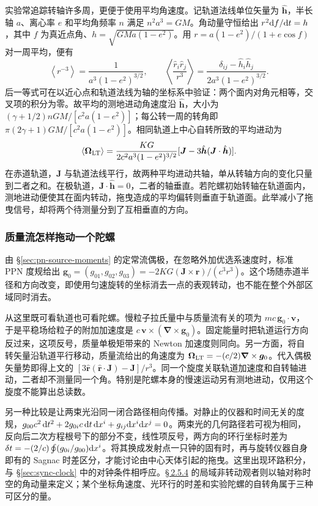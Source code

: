 实验常追踪转轴许多周，更便于使用平均角速度。记轨道法线单位矢量为 $\hat{\bm h}$，半长轴 $a$、离心率 $e$ 和平均角频率 $n$ 满足 $n^2a^3=GM$。角动量守恒给出 $r^2\dd f/\dd t=h$，其中 $f$ 为真近点角、$h=\sqrt{GMa(1-e^2)}$。用 $r=a(1-e^2)/(1+e\cos f)$ 对一周平均，便有
\[
    \left\langle r^{-3}\right\rangle=\frac{1}{a^3(1-e^2)^{3/2}},\qquad
    \left\langle\frac{\hat r_i\hat r_j}{r^3}\right\rangle
      =\frac{\delta_{ij}-\hat h_i\hat h_j}{2a^3(1-e^2)^{3/2}} .
\]
后一等式可在以近心点和轨道法线为轴的坐标系中验证：两个面内对角元相等，交叉项的积分为零。故平均的测地进动角速度沿 $\hat{\bm h}$，大小为 $(\gamma+1/2)nGM/[c^2a(1-e^2)]$；每公转一周的转角即 $\pi(2\gamma+1)GM/[c^2a(1-e^2)]$。相同轨道上中心自转所致的平均进动为
\[
    \langle\bm\Omega_{\rm LT}\rangle
       =\frac{KG}{2c^2a^3(1-e^2)^{3/2}}
             [\bm J-3\hat{\bm h}(\bm J\cdot\hat{\bm h})] .
\]
在赤道轨道，$\bm J$ 与轨道法线平行，故两种平均进动共轴，单从转轴方向的变化只量到二者之和。在极轨道，$\bm J\cdot\hat{\bm h}=0$，二者的轴垂直。若陀螺初始转轴在轨道面内，测地进动便使其在面内转动，拖曳造成的平均偏转则垂直于轨道面。此举减小了拖曳信号，却将两个待测量分到了互相垂直的方向。

\subsubsection{质量流怎样拖动一个陀螺}

由 \S\ref{sec:pn-source-moments} 的定常流偶极，在忽略外加优选系速度时，标准 PPN 度规给出 $\bm g_0=(g_{01},g_{02},g_{03})=-2KG(\bm J\times\bm r)/(c^3 r^3)$。这个场随赤道半径和方向改变，即使用匀速旋转的坐标消去一点的表观转动，也不能在整个外部区域同时消去。

从这里既可看轨道也可看陀螺。慢粒子拉氏量中与质量流有关的项为 $mc\,\bm g_0\cdot\bm v$，于是平稳场给粒子的附加加速度是 $c\,\bm v\times(\bm\nabla\times\bm g_0)$。固定能量时把轨道运行方向反过来，这项反号，质量单极矩带来的 Newton 加速度则同向。另一方面，将自转矢量沿轨道平行移动，质量流给出的角速度为 $\bm\Omega_{\rm LT}=-(c/2)\bm\nabla\times\bm g_0$。代入偶极矢量势即得上文的 $[3\hat{\bm r}(\hat{\bm r}\cdot\bm J)-\bm J]/r^3$。同一个旋度关联轨道加速度和自转轴进动，二者却不测量同一个角。特别是陀螺本身的慢速运动另有测地进动，仅用这个旋度不能算出总读数。

另一种比较是让两束光沿同一闭合路径相向传播。对静止的仪器和时间无关的度规，$g_{00}c^2\,\dd t^2+2g_{0i}c\,\dd t\,\dd x^i+g_{ij}\dd x^i\dd x^j=0$。两束光的几何路径若可视为相同，反向后二次方程根号下的部分不变，线性项反号，两方向的环行坐标时差为 $\delta t=-(2/c)\oint (g_{0i}/g_{00})\dd x^i$。将其换成发射点一只钟的固有时，再与旋转仪器自身即有的 Sagnac 时差区分，才能讨论由中心天体引起的拖曳。这里出现环路积分，与 \S\ref{sec:sync-clock} 中的对钟条件相呼应。\hyperlink{subsection.2.5.4}{\S\,2.5.4} 的局域非转动观者则以轴对称时空的角动量来定义；某个坐标角速度、光环行的时差和实验陀螺的自转角属于三种可区分的量。

